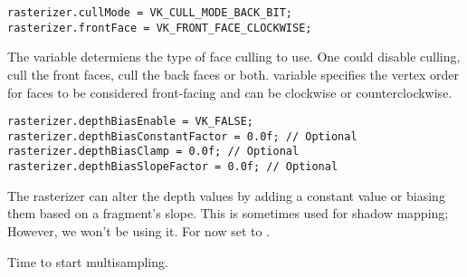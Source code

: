  \begin{center}
\begin{minipage}{0.95\linewidth}
\begin{lstlisting}
rasterizer.cullMode = VK_CULL_MODE_BACK_BIT;
rasterizer.frontFace = VK_FRONT_FACE_CLOCKWISE;
\end{lstlisting}
\end{minipage}
\end{center}

\par The  variable determiens the type of face culling to use. One could disable culling, cull the front faces, cull the back faces or both.  variable specifies the vertex order for faces to be considered front-facing and can be clockwise or counterclockwise.

\begin{center}
\begin{minipage}{0.95\linewidth}
\begin{lstlisting}
rasterizer.depthBiasEnable = VK_FALSE;
rasterizer.depthBiasConstantFactor = 0.0f; // Optional
rasterizer.depthBiasClamp = 0.0f; // Optional
rasterizer.depthBiasSlopeFactor = 0.0f; // Optional
\end{lstlisting}
\end{minipage}
\end{center}

\par The rasterizer can alter the depth values by adding a constant value or biasing them based on a fragment's slope. This is sometimes used for shadow mapping; However, we won't be using it. For now set  to .

\par Time to start multisampling.
